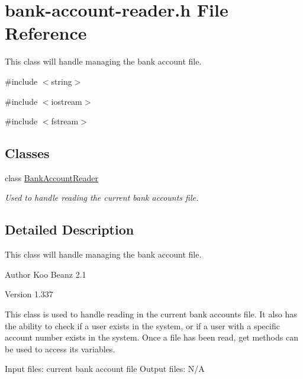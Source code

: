\hypertarget{bank-account-reader_8h}{
\section{bank-\/account-\/reader.h File Reference}
\label{bank-account-reader_8h}
}


This class will handle managing the bank account file.  


{\ttfamily \#include $<$string$>$}\par
{\ttfamily \#include $<$iostream$>$}\par
{\ttfamily \#include $<$fstream$>$}\par
\subsection*{Classes}
\begin{DoxyCompactItemize}
\item 
class \hyperlink{classBankAccountReader}{BankAccountReader}
\begin{DoxyCompactList}\small\item\em Used to handle reading the current bank accounts file. \item\end{DoxyCompactList}\end{DoxyCompactItemize}


\subsection{Detailed Description}
This class will handle managing the bank account file. \begin{DoxyAuthor}{Author}
Koo Beanz 2.1 
\end{DoxyAuthor}
\begin{DoxyVersion}{Version}
1.337
\end{DoxyVersion}
This class is used to handle reading in the current bank accounts file. It also has the ability to check if a user exists in the system, or if a user with a specific account number exists in the system. Once a file has been read, get methods can be used to access its variables.

Input files: current bank account file Output files: N/A 